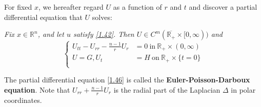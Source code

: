 For fixed $x$, we hereafter regard $U$ as a function of $r$ and $t$ and discover a partial differential equation that $U$ solves: 
\begin{lemma}\em
Fix $x\in\mathbb{R}^n$, and let $u$ satisfy \eqref{1.42}. Then $U\in C^m(\overline{\mathbb{R}_+}\times[0,\infty))$ and 
\begin{equation}
\left\{ \begin{aligned}\label{1.46}
	U_{tt}-U_{rr}-\frac{n-1}{r}U_r&=0\ \text{in}\ \mathbb{R}_+\times(0,\infty)\\
	U=G,U_t&=H\ \text{on}\ \mathbb{R}_+\times\{t=0\}\\
\end{aligned} \right. 
\end{equation}
\end{lemma}
The partial differential equation \eqref{1.46} is called the \textbf{Euler-Poisson-Darboux equation}. Note that $U_{rr}+\frac{n-1}{r}U_r$ is the radial part of the Laplacian $\Delta$ in polar coordinates.
